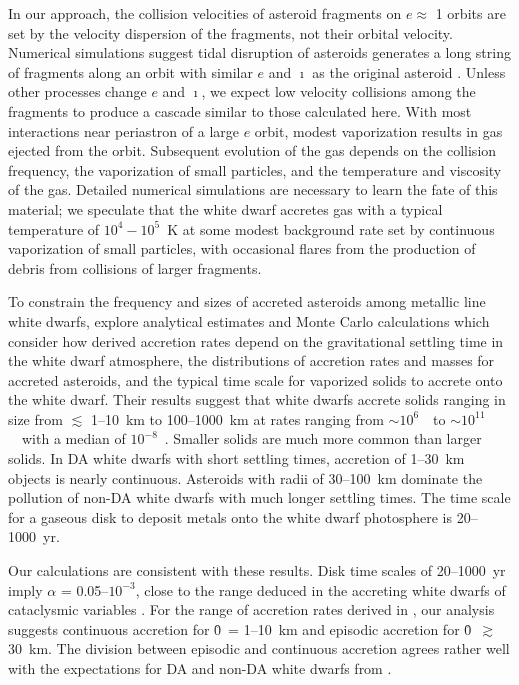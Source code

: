 \documentclass[12pt,preprint]{aastex}
\begin{document}
In our approach, the collision velocities of asteroid fragments on $e \approx$ 1 orbits are set
by the velocity dispersion of the fragments, not their orbital velocity. Numerical simulations 
suggest tidal disruption of asteroids generates a long string of fragments along an orbit with 
similar $e$ and $\imath$ as the original asteroid \citep[e.g.,][]{debes2012a}. Unless other 
processes change $e$ and $\imath$, we expect low velocity collisions among the fragments to produce 
a cascade similar to those calculated here. With most interactions near periastron of a large 
$e$ orbit, modest vaporization results in gas ejected from the orbit. Subsequent evolution
of the gas depends on the collision frequency, the vaporization of small particles, and the temperature 
and viscosity of the gas. Detailed numerical simulations are necessary to learn the fate of this
material; we speculate that the white dwarf accretes gas with a typical temperature of 
$10^4 - 10^5$~K at some modest background rate set by continuous vaporization of small particles, 
with occasional flares from the production of debris from collisions of larger fragments.

To constrain the frequency and sizes of accreted asteroids among metallic line white dwarfs, 
\citet{wyatt2014} explore analytical estimates and Monte Carlo calculations which consider 
how derived accretion rates depend on the gravitational settling time in the white dwarf atmosphere, 
the distributions of accretion rates and masses for accreted asteroids, and the typical time scale 
for vaporized solids to accrete onto the white dwarf. Their results suggest that white dwarfs 
accrete solids ranging in size from $\lesssim$ 1--10~km to 100--1000~km at rates ranging from 
$ \sim 10^6$~\gs\ to $\sim 10^{11}$~\gs\ with a median of $10^{-8}$~\gs. Smaller solids are 
much more common than larger solids.  In DA white dwarfs with short settling times, accretion of 
1--30~km objects is nearly continuous. Asteroids with radii of 30--100~km dominate the pollution 
of non-DA white dwarfs with much longer settling times. The time scale for a gaseous disk to 
deposit metals onto the white dwarf photosphere is 20--1000~yr. 

Our calculations are consistent with these results. Disk time scales of 20--1000~yr imply 
$\alpha$ = 0.05--$10^{-3}$, close to the range deduced in the accreting white dwarfs of cataclysmic 
variables \citep[e.g.,][]{smak1999,king2007,kotko2012}. For the range of accretion rates derived 
in \citet{wyatt2014}, our analysis suggests continuous accretion for \r0\ = 1--10~km and episodic 
accretion for \r0\ $\gtrsim$ 30~km. The division between episodic and continuous accretion agrees 
rather well with the expectations for DA and non-DA white dwarfs from \citet{wyatt2014}. 
\end{document}
